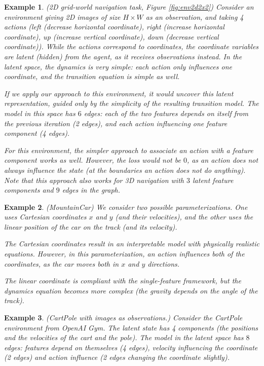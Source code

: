 \documentclass[a4paper,11pt,oneside]{report}
\newtheorem{example}{Example}[section]
\begin{document}
\begin{example}{(2D grid-world navigation task, Figure \ref{fig:env2d2x2})}
    Consider an environment giving 2D images of size $H\times W$ as an observation, and taking 4 actions (left (decrease horizontal coordinate), right (increase horizontal coordinate), up (increase vertical coordinate), down (decrease vertical coordinate)). While the actions correspond to coordinates, the coordinate variables are latent (hidden) from the agent, as it receives observations instead. In the latent space, the dynamics is very simple: each action only influences one coordinate, and the transition equation is simple as well.

    If we apply our approach to this environment, it would uncover this latent representation, guided only by the simplicity of the resulting transition model.
    The model in this space has $6$ edges: each of the two features depends on itself from the previous iteration (2 edges), and each action influencing one feature component (4 edges).

    For this environment, the simpler approach to associate an action with a feature component works as well. However, the loss would not be $0$, as an action does not always influence the state (at the boundaries an action does not do anything). Note that this approach also works for 3D navigation with $3$ latent feature components and $9$ edges in the graph.
\end{example}

\begin{example}{(MountainCar)}
    We consider two possible parameterizations. One uses Cartesian coordinates $x$ and $y$ (and their velocities), and the other uses the linear position of the car on the track (and its velocity).

    The Cartesian coordinates result in an interpretable model with physically realistic equations. However, in this parameterization, an action influences both of the coordinates, as the car moves both in $x$ and $y$ directions.

    The linear coordinate is compliant with the single-feature framework, but the dynamics equation becomes more complex (the gravity depends on the angle of the track).
\end{example}


\begin{example}{(CartPole with images as observations.)}
    Consider the CartPole environment from OpenAI Gym. The latent state has 4 components (the positions and the velocities of the cart and the pole).
    The model in the latent space has $8$ edges: features depend on themselves (4 edges), velocity influencing the coordinate (2 edges) and action influence (2 edges changing the coordinate slightly).
\end{example}
\end{document}
